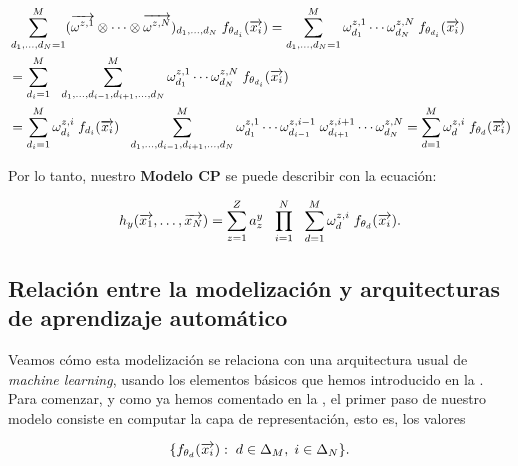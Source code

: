 \begin{equation}
	\begin{split}
		&\sum_{d_1, \ldots, d_N = 1}^{M}  (\overrightarrow{\omega^{z, 1}} \otimes \cdots \otimes \overrightarrow{\omega^{z, N}})_{d_1, \ldots, d_N} \; f_{\theta_{d_i}}(\overrightarrow{x_i}) = \sum_{d_1, \ldots, d_N = 1}^{M} \omega^{z, 1}_{d_1} \cdots \omega^{z, N}_{d_N} \; f_{\theta_{d_i}}(\overrightarrow{x_i}) \\
		&= \sum_{d_i = 1}^M \ \  \sum_{d_1, \ldots, d_{i -1}, d_{i+1}, \ldots, d_N}^M \omega^{z, 1}_{d_1} \cdots \omega^{z, N}_{d_N} \; f_{\theta_{d_i}}(\overrightarrow{x_i}) \\
		&= \sum_{d_i = 1}^M \omega_{d_i}^{z, i} \; f_{d_i}(\overrightarrow{x_i}) \ \  \sum_{d_1, \ldots, d_{i -1}, d_{i+1}, \ldots, d_N}^M \omega^{z, 1}_{d_1} \cdots \omega^{z, i-1}_{d_{i-1}} \; \omega^{z, i+1}_{d_{i+1}} \cdots \omega^{z, N}_{d_N} = \sum_{d = 1}^{M} \omega_d^{z,i}  \; f_{\theta_{d}}(\overrightarrow{x_i})
	\end{split}
\end{equation}

Por lo tanto, nuestro \textbf{Modelo CP} se puede describir con la ecuación:

\begin{equation} \label{eq:cp_model}
	h_y(\overrightarrow{x_1}, \ldots, \overrightarrow{x_N}) =  \sum_{z = 1}^Z a_z^y \ \  \prod_{i = 1}^N \ \  \sum_{d = 1}^{M} \omega^{z, i}_d \; f_{\theta_{d}}(\overrightarrow{x_i}).
\end{equation}

\subsection{Relación entre la modelización y arquitecturas de aprendizaje automático}

Veamos cómo esta modelización se relaciona con una arquitectura usual de \textit{machine learning}, usando los elementos básicos que hemos introducido en la . Para comenzar, y como ya hemos comentado en la , el primer paso de nuestro modelo consiste en computar la capa de representación, esto es, los valores

\begin{equation}
    \{ f_{\theta_d}(\overrightarrow{x_i}) : \; d \in \Delta_{M}, \; i \in \Delta_{N} \}.
\end{equation}

